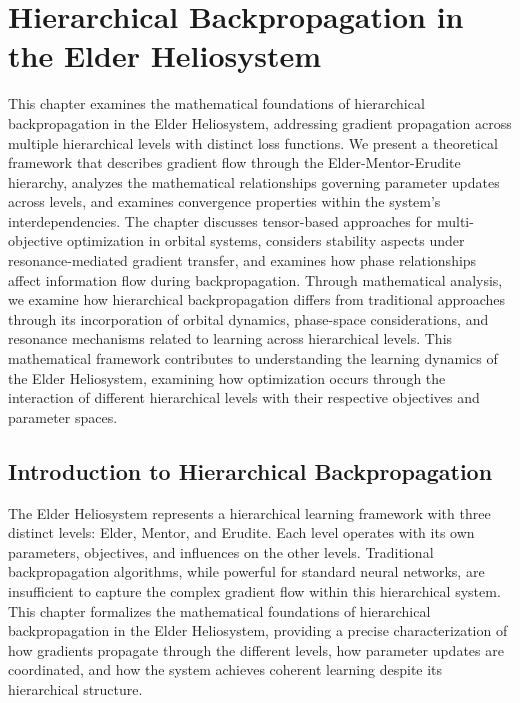 \chapter{Hierarchical Backpropagation in the Elder Heliosystem}

\begin{tcolorbox}[colback=PureBlue!5!white,colframe=PureBlue!75!black,title=Chapter Summary]
This chapter examines the mathematical foundations of hierarchical backpropagation in the Elder Heliosystem, addressing gradient propagation across multiple hierarchical levels with distinct loss functions. We present a theoretical framework that describes gradient flow through the Elder-Mentor-Erudite hierarchy, analyzes the mathematical relationships governing parameter updates across levels, and examines convergence properties within the system's interdependencies. The chapter discusses tensor-based approaches for multi-objective optimization in orbital systems, considers stability aspects under resonance-mediated gradient transfer, and examines how phase relationships affect information flow during backpropagation. Through mathematical analysis, we examine how hierarchical backpropagation differs from traditional approaches through its incorporation of orbital dynamics, phase-space considerations, and resonance mechanisms related to learning across hierarchical levels. This mathematical framework contributes to understanding the learning dynamics of the Elder Heliosystem, examining how optimization occurs through the interaction of different hierarchical levels with their respective objectives and parameter spaces.
\end{tcolorbox}

\section{Introduction to Hierarchical Backpropagation}

The Elder Heliosystem represents a hierarchical learning framework with three distinct levels: Elder, Mentor, and Erudite. Each level operates with its own parameters, objectives, and influences on the other levels. Traditional backpropagation algorithms, while powerful for standard neural networks, are insufficient to capture the complex gradient flow within this hierarchical system. This chapter formalizes the mathematical foundations of hierarchical backpropagation in the Elder Heliosystem, providing a precise characterization of how gradients propagate through the different levels, how parameter updates are coordinated, and how the system achieves coherent learning despite its hierarchical structure.

